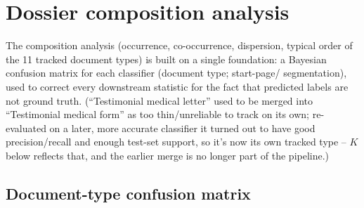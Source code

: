 %
%
\newcommand{\Dir}{\mathrm{Dirichlet}}
\newcommand{\Mult}{\mathrm{Multinomial}}
\newcommand{\NegBinom}{\mathrm{NegBinom}}
\newcommand{\Binom}{\mathrm{Binomial}}
\newcommand{\BetaBinom}{\mathrm{BetaBinomial}}
\newcommand{\HalfNormal}{\mathrm{HalfNormal}}
\newcommand{\Gammadist}{\mathrm{Gamma}}

\section{Dossier composition analysis}

The composition analysis (occurrence, co-occurrence, dispersion, typical
order of the 11 tracked document types) is built on a single foundation: a
Bayesian confusion matrix for each classifier (document type; start-page/
segmentation), used to correct every downstream statistic for the fact that
predicted labels are not ground truth. (``Testimonial medical letter'' used
to be merged into ``Testimonial medical form'' as too thin/unreliable to
track on its own; re-evaluated on a later, more accurate classifier it
turned out to have good precision/recall and enough test-set support, so
it's now its own tracked type -- $K$ below reflects that, and the earlier
merge is no longer part of the pipeline.)

\subsection{Document-type confusion matrix}
\label{sec:confusion-matrix}


